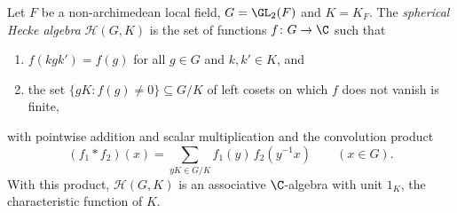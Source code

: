 Let $F$ be a non-archimedean local field, $G=\GL_2(F)$ and $K=K_F$. The \emph{spherical Hecke algebra}
$\mathcal H(G,K)$ is the set of functions $f\colon G\to\C$ such that
\begin{enumerate}[label=(\roman*)]
\item $f(kgk')=f(g)$ for all $g\in G$ and $k,k'\in K$, and
\item the set $\{gK:f(g)\neq0\}\subseteq G/K$ of left cosets on which $f$ does not vanish is finite,
\end{enumerate}
with pointwise addition and scalar multiplication and the convolution product
\[
  (f_1*f_2)(x)=\sum_{yK\in G/K}f_1(y)\,f_2(y^{-1}x)\qquad(x\in G).
\]
With this product, $\mathcal H(G,K)$ is an associative $\C$-algebra with unit $1_K$, the characteristic function
of $K$.
